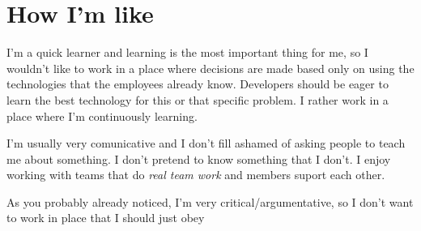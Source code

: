 \documentclass[11pt,a4paper,sans]{moderncv}
\begin{document}
\section{How I'm like}
I'm a quick learner and learning is the most important thing for me,
so I wouldn't like to work in a place where decisions are made based
only on using the technologies that the employees already
know. Developers should be eager to learn the best technology for this or that
specific problem. I rather work in a place where I'm continuously learning.

I'm usually very comunicative and I don't fill ashamed of asking people
to teach me about something. I don't pretend to know something that I don't.
I enjoy working with teams that do \textit{real team work} and members
suport each other. 

As you probably already noticed, I'm very critical/argumentative, so
I don't want to work in place that I should just obey 
\end{document}
